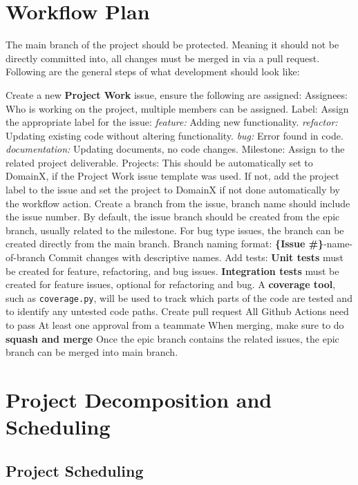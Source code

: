 \documentclass{article}
\begin{document}
\section{Workflow Plan}
The main branch of the project should be protected. Meaning it should not be directly committed into, all changes must be merged in via a pull request.
Following are the general steps of what development should look like:
\begin{outline}[itemize]
 \1 Create a new \textbf{Project Work} issue, ensure the following are assigned:
  \2 Assignees: Who is working on the project, multiple members can be assigned.
  \2 Label: Assign the appropriate label for the issue:
    \3 \textit{feature:} Adding new functionality.
    \3 \textit{refactor:} Updating existing code without altering functionality.
    \3 \textit{bug:} Error found in code.
    \3 \textit{documentation:} Updating documents, no code changes.
  \2 Milestone: Assign to the related project deliverable.
  \2 Projects: This should be automatically set to DomainX, if the Project Work issue template was used.
    \3 If not, add the project label to the issue and set the project to DomainX if not done automatically by the workflow action.
\1 Create a branch from the issue, branch name should include the issue number. 
  \2 By default, the issue branch should be created from the epic branch, usually related to the milestone.
  \2 For bug type issues, the branch can be created directly from the main branch.
  \2 Branch naming format: \textbf{\{Issue \#\}}-name-of-branch
\1 Commit changes with descriptive names.
\1 Add tests:
  \2 \textbf{Unit tests} must be created for feature, refactoring, and bug issues.
  \2 \textbf{Integration tests} must be created for feature issues, optional for refactoring and bug.
\2 A \textbf{coverage tool}, such as \texttt{coverage.py}, will be used to track which parts of the code are tested and to identify any untested code paths.
\1 Create pull request
  \2 All Github Actions need to pass
  \2 At least one approval from a teammate
  \2 When merging, make sure to do \textbf{squash and merge}
\1 Once the epic branch contains the related issues, the epic branch can be merged into main branch.
\end{outline}

\section{Project Decomposition and Scheduling}

\subsection*{Project Scheduling}
\end{document}
